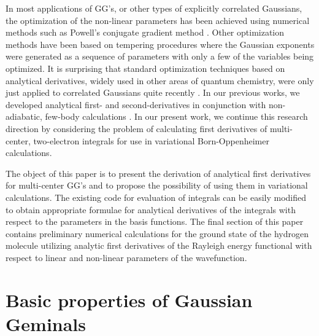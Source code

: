 In most applications of GG's, or other types of explicitly correlated
Gaussians, the optimization of the non-linear parameters has been achieved
using numerical methods such as Powell's conjugate gradient method \cite
{powell1}. Other optimization methods have been based on tempering
procedures \cite{poshusta1, Alexander1, Alexander2, Rybak} where the
Gaussian exponents were generated as a sequence of parameters with only a
few of the variables being optimized. It is surprising that standard
optimization techniques based on analytical derivatives, widely used in
other areas of quantum chemistry, were only just applied to correlated
Gaussians quite recently \cite{koz92a, koz92b, kinghorn1}. In our previous
works, we developed analytical first- and second-derivatives in conjunction
with non-adiabatic, few-body calculations \cite{koz92a, koz92b}. In our
present work, we continue this research direction by considering the problem
of calculating first derivatives of multi-center, two-electron integrals for
use in variational Born-Oppenheimer calculations.

The object of this paper is to present the derivation of analytical first
derivatives for multi-center GG's and to propose the possibility of using
them in variational calculations. The existing code for evaluation of
integrals can be easily modified to obtain appropriate formulae for
analytical derivatives of the integrals with respect to the parameters in
the basis functions. The final section of this paper contains preliminary
numerical calculations for the ground state of the hydrogen molecule
utilizing analytic first derivatives of the Rayleigh energy functional with
respect to linear and non-linear parameters of the wavefunction.

\section{Basic properties of Gaussian Geminals}

